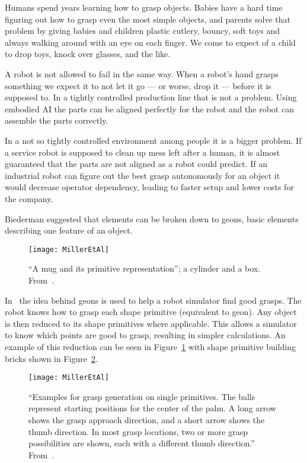 Humans spend years learning how to grasp objects.
Babies have a hard time figuring out how to grasp even the most simple objects,
and parents solve that problem by giving babies and children plastic cutlery, bouncy, soft toys and always walking around with an eye on each finger.
We come to expect of a child to drop toys, knock over glasses, and the like.

A robot is not allowed to fail in the same way.
When a robot's hand grasps something we expect it to not let it go --- or worse, drop it --- before it is supposed to.
In a tightly controlled production line that is not a problem.
Using embodied AI the parts can be aligned perfectly for the robot and the robot can assemble the parts correctly.

In a not so tightly controlled environment among people it is a bigger problem.
If a service robot is supposed to clean up mess left after a human, it is almost guaranteed that the parts are not aligned as a robot could predict.
If an industrial robot can figure out the best grasp autonomously for an object it would decrease operator dependency,
leading to faster setup and lower costs for the company.

\label{ssec:millergrasp}
Biederman suggested that elements can be broken down to geons, basic elements describing one feature of an object.

\begin{figure}
	\centering
	\texttt{[image: MillerEtAl]}
	\caption{``A mug and its primitive representation''; a cylinder and a box. From~\cite{miller}.}
\label{fig:miller3}
\end{figure}

In~\cite{miller} the idea behind geons is used to help a robot simulator find good grasps.
The robot knows how to grasp each shape primitive (equivalent to geon).
Any object is then reduced to its shape primitives where applicable.
This allows a simulator to know which points are good to grasp, resulting in simpler calculations.
An example of this reduction can be seen in Figure~\ref{fig:miller3} with shape primitive building bricks shown in Figure~\ref{fig:miller4}.

\begin{figure}
	\centering
	\texttt{[image: MillerEtAl]}
	\caption{``Examples for grasp generation on single primitives.
    The balls represent starting positions for the center of the palm.
    A long arrow shows the grasp approach direction, and a short arrow shows the thumb direction.
    In most grasp locations, two or more grasp possibilities are shown, each with a different thumb direction.'' From~\cite{miller}.}
\label{fig:miller4}
\end{figure}

